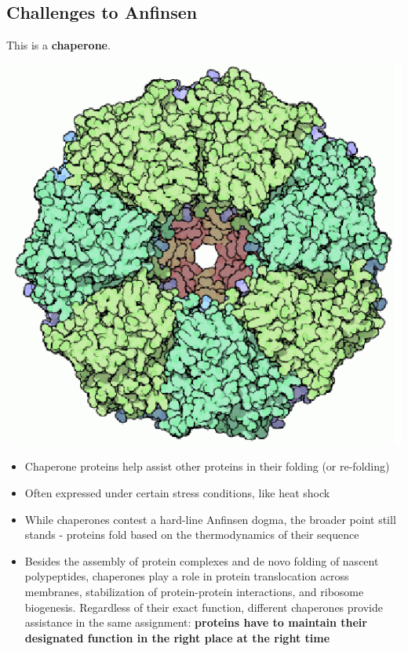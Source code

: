 \documentclass[10pt]{article}
\begin{document}
\subsection*{Challenges to Anfinsen}
This is a \textbf{chaperone}.
\begin{center}
    \includegraphics[scale=0.7]{L4_12.png}
\end{center}

\begin{itemize}
    \item Chaperone proteins help assist other proteins in their folding (or re-folding)
    \item Often expressed under certain stress conditions, like heat shock
    \item While chaperones contest a hard-line Anfinsen dogma, the broader point still stands - proteins fold based on the thermodynamics of their sequence
    \item Besides the assembly of protein complexes and de novo folding of nascent polypeptides, chaperones play a role in protein translocation across membranes, stabilization of protein-protein interactions, and ribosome biogenesis.  Regardless of their exact function, different chaperones provide assistance in the same assignment: \textbf{proteins have to maintain their designated function in the right place at the right time}
\end{itemize}
\end{document}
